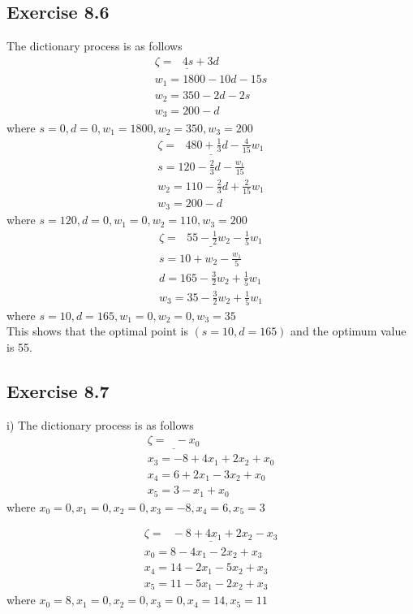 \documentclass[11.5pt, letterpaper, bibtotoc,
    tablecaptionabove, figurecaptionabove]{article}
\begin{document}
\subsection*{Exercise 8.6}
The dictionary process is as follows
\begin{align*}
	\underline{\zeta = \:\:\: 4s + 3d}\\
	w_1 = 1800 -10d - 15s \\
	w_2 = 350 - 2d - 2s \\
	w_3 = 200 - d
\end{align*}
where $s = 0, d = 0, w_1 = 1800, w_2 = 350, w_3 = 200$
\begin{align*}
	\underline{\zeta = \:\:\: 480 + \frac{1}{3}d - \frac{4}{15}w_1}\\
	s = 120 - \frac{2}{3}d - \frac{w_1}{15}\\
	w_2 = 110 - \frac{2}{3}d + \frac{2}{15}w_1 \\
	w_3 = 200 - d
\end{align*}
where $s = 120, d = 0, w_1 = 0, w_2 = 110, w_3 = 200$
\begin{align*}
	\underline{\zeta = \:\:\: 55 - \frac{1}{2}w_2 - \frac{1}{5}w_1}\\
	s = 10 + w_2 - \frac{w_1}{5}\\
	d = 165 - \frac{3}{2}w_2 + \frac{1}{5}w_1 \\
	w_3 = 35 - \frac{3}{2}w_2 + \frac{1}{5}w_1
\end{align*}
where $s = 10, d = 165, w_1 = 0, w_2 = 0, w_3 = 35$ \\
This shows that the optimal point is $(s=10, d=165)$ and the optimum value is 55. 

\subsection*{Exercise 8.7}
i) 
The dictionary process is as follows
\begin{align*}
	\underline{\zeta = \:\:\: -x_0}\\
	x_3 = -8 + 4x_1 + 2x_2 + x_0 \\
	x_4 = 6 + 2x_1 - 3x_2 + x_0 \\
	x_5 = 3 - x_1 + x_0
\end{align*}
where $x_0 = 0, x_1 = 0, x_2 = 0, x_3 = -8, x_4 = 6, x_5 = 3$ 

\begin{align*}
	\underline{\zeta = \:\:\: -8 + 4x_1 + 2x_2 - x_3}\\
	x_0 = 8 - 4x_1 - 2x_2 + x_3 \\
	x_4 = 14 - 2x_1 - 5x_2 + x_3 \\
	x_5 = 11 - 5x_1 -2x_2 + x_3
\end{align*}
where $x_0 = 8, x_1 = 0, x_2 = 0, x_3 = 0, x_4 = 14, x_5 = 11$
\end{document}
